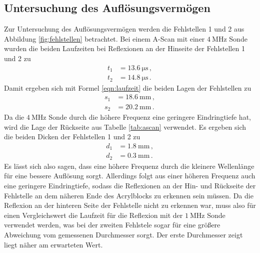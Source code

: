 \subsection{Untersuchung des Auflösungsvermögen}
Zur Untersuchung des Auflösungsvermögen werden die Fehlstellen 1 und 2 aus Abbildung 
\ref{fig:fehlstellen} betrachtet. 
Bei einem A-Scan mit einer $\SI{4}{\mega\hertz}$ Sonde wurden die beiden Laufzeiten bei
Reflexionen an der Hinseite der Fehlstellen 1 und 2 zu
\begin{align*}
	t_1 &= \SI{13.6}{\micro\second} \, \mathrm{,} \\
	t_2 &= \SI{14.8}{\micro\second} \, \mathrm{.}
\end{align*}
Damit ergeben sich mit Formel \eqref{eqn:laufzeit} die beiden Lagen der Fehlstellen zu
\begin{align*}
	s_1 &= \SI{18.6}{\milli\meter} \, \mathrm{,} \\
	s_2 &= \SI{20.2}{\milli\meter} \, \mathrm{.}
\end{align*}
Da die $\SI{4}{\mega\hertz}$ Sonde durch die höhere Frequenz eine geringere Eindringtiefe 
hat, wird die Lage der Rückseite aus Tabelle \ref{tab:ascan} verwendet.
Es ergeben sich die beiden Dicken der Fehlstellen 1 und 2 zu
\begin{align*}
	d_1 &= \SI{1.8}{\milli\meter} \, \mathrm{,} \\
	d_2 &= \SI{0.3}{\milli\meter} \, \mathrm{.}
\end{align*}
Es lässt sich also sagen, dass eine höhere Frequenz durch die kleinere Wellenlänge 
für eine bessere Auflösung sorgt.
Allerdings folgt aus einer höheren Frequenz auch eine geringere Eindringtiefe, sodass die 
Reflexionen an der Hin- und Rückseite der Fehlstelle an dem näheren Ende des Acrylblocks zu
erkennen sein müssen.
Da die Reflexion an der hinteren Seite der Fehlstelle nicht zu erkennen war, muss also für 
einen Vergleichswert die Laufzeit für die Reflexion mit der $\SI{1}{\mega\hertz}$ Sonde 
verwendet werden, was bei der zweiten Fehlstele sogar für eine größere Abweichung vom gemessenen
Durchmesser sorgt. Der erste Durchmesser zeigt liegt näher am erwarteten Wert.

